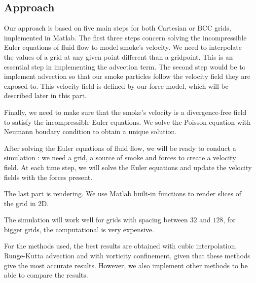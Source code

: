 \documentclass[accepted,single]{gipaper}
\begin{document}
\subsection{Approach}


Our approach is based on five main steps for both Cartesian or BCC grids, implemented in Matlab. The first three steps concern solving the incompressible Euler equations of fluid flow to model smoke's velocity.  We need to interpolate the values of a grid at any given point different than a gridpoint. This is an essential step in implementing the advection term.
The second step would be to implement advection so that our smoke particles follow the velocity field they are exposed to. This velocity field is defined by our force model, which will be described later in this part.

Finally, we need to make sure that the smoke's velocity is a divergence-free field to satisfy the incompressible Euler equations. We solve the Poisson equation with Neumann boudary condition to obtain a unique solution. 

After solving the Euler equations of fluid flow, we will be ready to conduct a simulation : we need a grid, a source of smoke and forces to create a velocity field. At each time step, we will solve the Euler equations and update the velocity fields with the forces present.

The last part is rendering. We use Matlab built-in functions to render slices of the grid in 2D.



The simulation will work well for grids with spacing between $32$ and $128$, for bigger grids, the computational is very expensive.

For the methods used, the best results are obtained with cubic interpolation, Runge-Kutta advection and with vorticity confinement, given that these methods give the most accurate results. However, we also implement other methods to be able to compare the results.
\end{document}
